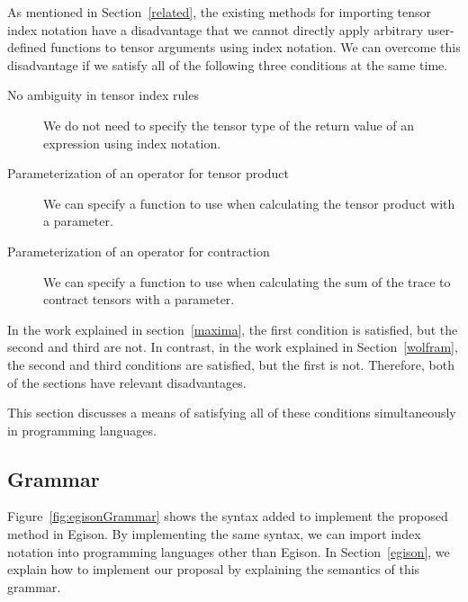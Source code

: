 \documentclass[acmlarge]{acmart}
\begin{document}
As mentioned in Section~\ref{related}, the existing methods for importing tensor index notation have a disadvantage that we cannot directly apply arbitrary user-defined functions to tensor arguments using index notation.
We can overcome this disadvantage if we satisfy all of the following three conditions at the same time.

\begin{description}
 \item[No ambiguity in tensor index rules] We do not need to specify the tensor type of the return value of an expression using index notation.
 \item[Parameterization of an operator for tensor product] We can specify a function to use when calculating the tensor product with a parameter.
 \item[Parameterization of an operator for contraction] We can specify a function to use when calculating the sum of the trace to contract tensors with a parameter.
\end{description}

In the work explained in section~\ref{maxima}, the first condition is satisfied, but the second and third are not.
In contrast, in the work explained in Section~\ref{wolfram}, the second and third conditions are satisfied, but the first is not.
Therefore, both of the sections have relevant disadvantages.

This section discusses a means of satisfying all of these conditions simultaneously in programming languages.

\subsection{Grammar}\label{tensor-grammar}

Figure~\ref{fig:egisonGrammar} shows the syntax added to implement the proposed method in Egison.
By implementing the same syntax, we can import index notation into programming languages other than Egison.
In Section~\ref{egison}, we explain how to implement our proposal by explaining the semantics of this grammar.
\end{document}
